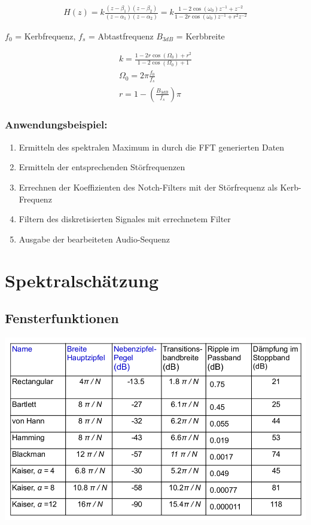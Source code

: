 \documentclass[10pt,a4paper]{article}
\begin{document}
  \begin{mdframed}[style=exercise]
    \begin{align}
  H(z) = k \frac{(z-\beta_1)(z-\beta_2)}{(z-\alpha_1)(z-\alpha_2)} 
       = k \frac{1-2\cos(\omega_0)z^{-1}+z^{-2}}{1-2r\cos(\omega_0)z^{-1}+r^2 z^{-2}}
    \end{align}
  \end{mdframed}
$f_0$ = Kerbfrequenz, $f_s$ = Abtastfrequenz $B_{3dB}$ = Kerbbreite 
  \begin{mdframed}[style=exercise]
    \begin{align}
      k = \frac{1-2r\cos(\Omega_0)+r^2}{1-2\cos(\Omega_0)+1}\\
      \Omega_0 = 2\pi \frac{f_0}{f_s}\\
      r=1-(\frac{B_{3dB}}{f_s})\pi
    \end{align}
  \end{mdframed}

\subsubsection{Anwendungsbeispiel:}
\begin{enumerate}
  \item Ermitteln des spektralen Maximum in durch die FFT generierten Daten
  \item Ermitteln der entsprechenden Störfrequenzen
  \item Errechnen der Koeffizienten des Notch-Filters mit der Störfrequenz als Kerb-Frequenz
  \item Filtern des diskretisierten Signales mit errechnetem Filter
  \item Ausgabe der bearbeiteten Audio-Sequenz
\end{enumerate}

\section{Spektralschätzung}
\subsection{Fensterfunktionen}

\begin{center}
  \includegraphics[width=.5\textwidth]{./img/Fensterfunktionen_Vergleich.png}
\end{center}
\end{document}
